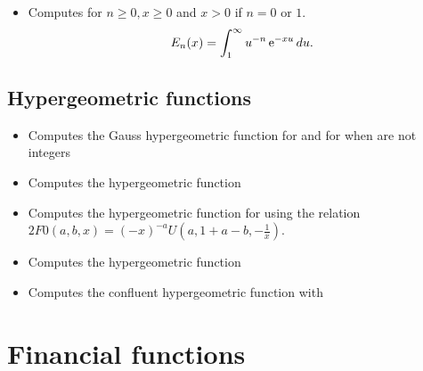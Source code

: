\begin{itemize}
\item {}
  \sshortdescribe   Computes for  $ n\geq 0, x \geq 0$ and $x>0$ if $n=0$ or $1$.
  \begin{equation*}
    E_n(x)= \int_1^{\infty} u^{-n} \operatorname{e}^{ -x u } du.
  \end{equation*}
\end{itemize}

\subsection{Hypergeometric functions}

\begin{itemize}
\item {}
  \sshortdescribe Computes the Gauss hypergeometric function 
  for  and for  when  are
  not integers
\item {}
  \sshortdescribe Computes the hypergeometric function 
\item {}
  \sshortdescribe Computes the hypergeometric function   for
   using the relation $2F0 (a,b,x) = (-x)^{-a} U(a,1+a-b,-\frac{1}{x})$.
\item {}
  \sshortdescribe Computes the hypergeometric function 
\item {}
  \sshortdescribe Computes the confluent hypergeometric function 
  with 
\end{itemize}


\section{Financial functions}

